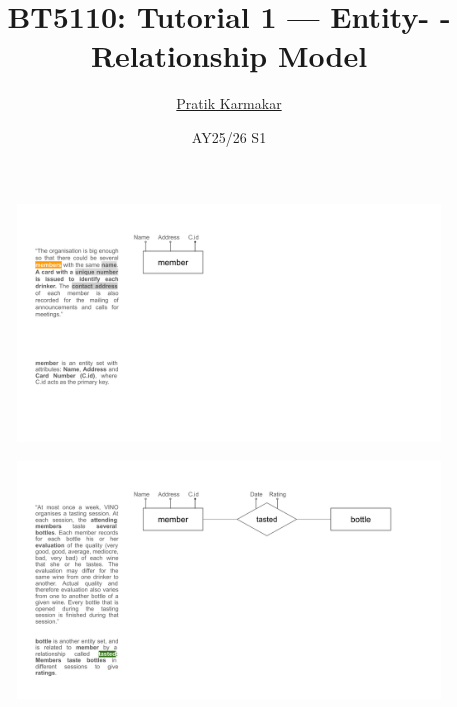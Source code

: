 \documentclass{beamer}
\title{BT5110: Tutorial 1 — Entity- - Relationship Model}
\author{\href{https://pratik2358.github.io/}{Pratik Karmakar}}
\institute{School of Computing,\\ National University of Singapore}
\date{AY25/26 S1}
\begin{document}
\begin{frame}
  \titlepage
\end{frame}

\begin{frame}
    \begin{figure}
        \centering
        \includegraphics[width=1.1\linewidth]{tut_02_files/01.pdf}
    \end{figure}
\end{frame}

\begin{frame}
    \begin{figure}
        \centering
        \includegraphics[width=1.1\linewidth]{tut_02_files/02.pdf}
    \end{figure}
\end{frame}
\end{document}
